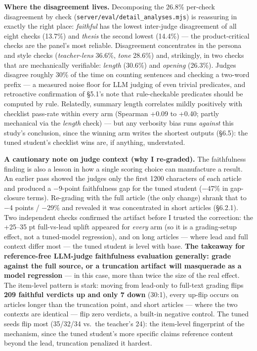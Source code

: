 \documentclass[11pt]{article}
\begin{document}
\textbf{Where the disagreement lives.} Decomposing the 26.8\% per-check
disagreement by check (\texttt{server/eval/detail\_analyses.mjs}) is
reassuring in exactly the right place: \emph{faithful} has the lowest
inter-judge disagreement of all eight checks (13.7\%) and \emph{thesis}
the second lowest (14.4\%) --- the product-critical checks are the
panel's most reliable. Disagreement concentrates in the persona and
style checks (\emph{teacher-lens} 36.6\%, \emph{tone} 28.6\%) and,
strikingly, in two checks that are mechanically verifiable:
\emph{length} (30.6\%) and \emph{opening} (26.3\%). Judges disagree
roughly 30\% of the time on counting sentences and checking a two-word
prefix --- a measured noise floor for LLM judging of even trivial
predicates, and retroactive confirmation of §5.1's note that
rule-checkable predicates should be computed by rule. Relatedly, summary
length correlates mildly positively with checklist pass-rate within
every arm (Spearman +0.09 to +0.40; partly mechanical via the
\emph{length} check) --- but any verbosity bias runs \emph{against} this
study's conclusion, since the winning arm writes the shortest outputs
(§6.5): the tuned student's checklist wins are, if anything,
understated.

\textbf{A cautionary note on judge context (why I re-graded).} The
faithfulness finding is also a lesson in how a single scoring choice can
manufacture a result. An earlier pass showed the judges only the first
1200 characters of each article and produced a −9-point faithfulness gap
for the tuned student (−47\% in gap-closure terms). Re-grading with the
full article (the only change) shrank that to −4 points / −29\% and
revealed it was concentrated in short articles (§6.2.1). Two independent
checks confirmed the artifact before I trusted the correction: the
+25--35 pt full-vs-lead uplift appeared for \emph{every} arm (so it is a
grading-setup effect, not a tuned-model regression), and on long
articles --- where lead and full context differ most --- the tuned
student is level with base. \textbf{The takeaway for reference-free
LLM-judge faithfulness evaluation generally: grade against the full
source, or a truncation artifact will masquerade as a model regression}
--- in this case, more than twice the size of the real effect. The
item-level pattern is stark: moving from lead-only to full-text grading
flips \textbf{209 faithful verdicts up and only 7 down} (30:1), every
up-flip occurs on articles longer than the truncation point, and short
articles --- where the two contexts are identical --- flip zero
verdicts, a built-in negative control. The tuned seeds flip most
(35/32/34 vs.~the teacher's 24): the item-level fingerprint of the
mechanism, since the tuned student's more specific claims reference
content beyond the lead, truncation penalized it hardest.
\end{document}
